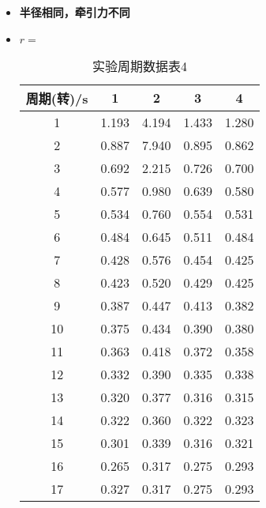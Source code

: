 \documentclass[12pt,hyperref,a4paper,UTF8]{ctexart}
\begin{document}
\begin{itemize}
        \item \textbf{半径相同，牵引力不同}
            \item $r=$
                \begin{table}[h!]
                    \centering
                    \begin{tabular}{ccccc}
                    \toprule
                    \textbf{周期(转)/s} & \textbf{1} & \textbf{2} & \textbf{3} & \textbf{4} \\
                    \midrule
                    1  & 1.193 & 4.194 & 1.433 & 1.280 \\
                    2  & 0.887 & 7.940 & 0.895 & 0.862 \\
                    3  & 0.692 & 2.215 & 0.726 & 0.700 \\
                    4  & 0.577 & 0.980 & 0.639 & 0.580 \\
                    5  & 0.534 & 0.760 & 0.554 & 0.531 \\
                    6  & 0.484 & 0.645 & 0.511 & 0.484 \\
                    7  & 0.428 & 0.576 & 0.454 & 0.425 \\
                    8  & 0.423 & 0.520 & 0.429 & 0.425 \\
                    9  & 0.387 & 0.447 & 0.413 & 0.382 \\
                    10 & 0.375 & 0.434 & 0.390 & 0.380 \\
                    11 & 0.363 & 0.418 & 0.372 & 0.358 \\
                    12 & 0.332 & 0.390 & 0.335 & 0.338 \\
                    13 & 0.320 & 0.377 & 0.316 & 0.315 \\
                    14 & 0.322 & 0.360 & 0.322 & 0.323 \\
                    15 & 0.301 & 0.339 & 0.316 & 0.321 \\
                    16 & 0.265 & 0.317 & 0.275 & 0.293 \\
                    17 & 0.327 & 0.317 & 0.275 & 0.293 \\
                    \bottomrule
                    \end{tabular}
                    \caption{实验周期数据表4}
                    \end{table}
                    

\end{itemize}
\end{document}
